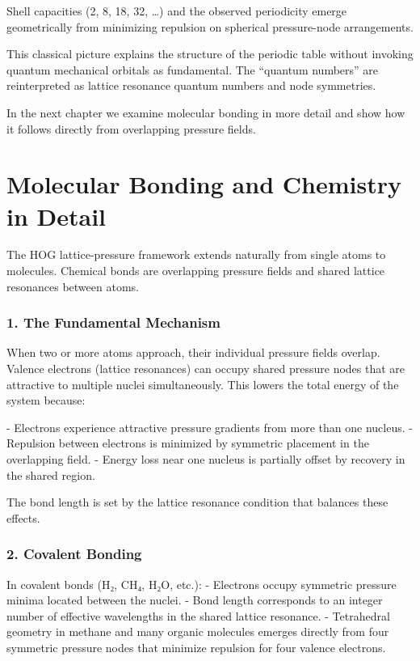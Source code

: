 \documentclass[11pt,a4paper]{book}
\begin{document}
{Shell capacities (2, 8, 18, 32, …) and the observed periodicity emerge geometrically from minimizing repulsion on spherical pressure-node arrangements.

This classical picture explains the structure of the periodic table without invoking quantum mechanical orbitals as fundamental. The “quantum numbers” are reinterpreted as lattice resonance quantum numbers and node symmetries.

In the next chapter we examine molecular bonding in more detail and show how it follows directly from overlapping pressure fields.

\chapter{Molecular Bonding and Chemistry in Detail}

The HOG lattice-pressure framework extends naturally from single atoms to molecules. Chemical bonds are overlapping pressure fields and shared lattice resonances between atoms.

\subsection{1. The Fundamental Mechanism}
When two or more atoms approach, their individual pressure fields overlap. Valence electrons (lattice resonances) can occupy shared pressure nodes that are attractive to multiple nuclei simultaneously. This lowers the total energy of the system because:

- Electrons experience attractive pressure gradients from more than one nucleus.
- Repulsion between electrons is minimized by symmetric placement in the overlapping field.
- Energy loss near one nucleus is partially offset by recovery in the shared region.

The bond length is set by the lattice resonance condition that balances these effects.

\subsection{2. Covalent Bonding}
In covalent bonds (H₂, CH₄, H₂O, etc.):
- Electrons occupy symmetric pressure minima located between the nuclei.
- Bond length corresponds to an integer number of effective wavelengths in the shared lattice resonance.
- Tetrahedral geometry in methane and many organic molecules emerges directly from four symmetric pressure nodes that minimize repulsion for four valence electrons.

}
\end{document}
